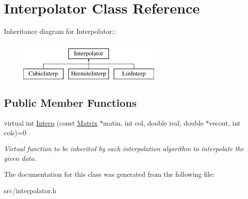\hypertarget{classInterpolator}{
\section{Interpolator Class Reference}
\label{d3/df3/classInterpolator}
}
Inheritance diagram for Interpolator::\begin{figure}[H]
\begin{center}
\leavevmode
\includegraphics[height=2cm]{d3/df3/classInterpolator}
\end{center}
\end{figure}
\subsection*{Public Member Functions}
\begin{DoxyCompactItemize}
\item 
\hypertarget{classInterpolator_a2238defccb009047f624bda33cc47c73}{
virtual int \hyperlink{classInterpolator_a2238defccb009047f624bda33cc47c73}{Interp} (const \hyperlink{classMatrix}{Matrix} $\ast$matin, int col, double ival, double $\ast$vecout, int cols)=0}
\label{d3/df3/classInterpolator_a2238defccb009047f624bda33cc47c73}

\begin{DoxyCompactList}\small\item\em Virtual function to be inherited by each interpolation algorithm to interpolate the given data. \item\end{DoxyCompactList}\end{DoxyCompactItemize}


The documentation for this class was generated from the following file:\begin{DoxyCompactItemize}
\item 
src/interpolator.h\end{DoxyCompactItemize}
